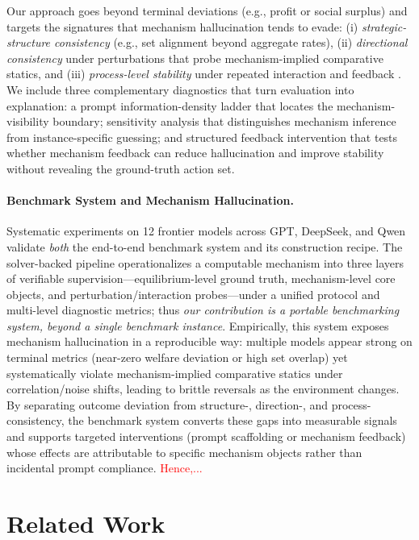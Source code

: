 \documentclass[sigconf,anonymous,review]{acmart}
\theoremstyle{definition}
\begin{document}
Our approach goes beyond terminal deviations (e.g., profit or social surplus) and targets the signatures that mechanism hallucination tends to evade: (i) \emph{strategic-structure consistency} (e.g., set alignment beyond aggregate rates), (ii) \emph{directional consistency} under perturbations that probe mechanism-implied comparative statics, and (iii) \emph{process-level stability} under repeated interaction and feedback \citep{akata2025repeatedgames}. We include three complementary diagnostics that turn evaluation into explanation: a prompt information-density ladder that locates the mechanism-visibility boundary; sensitivity analysis that distinguishes mechanism inference from instance-specific guessing; and structured feedback intervention that tests whether mechanism feedback can reduce hallucination and improve stability without revealing the ground-truth action set.

\paragraph{Benchmark System and Mechanism Hallucination.}
Systematic experiments on 12 frontier models across GPT, DeepSeek, and Qwen validate \emph{both} the end-to-end benchmark system and its construction recipe. The solver-backed pipeline operationalizes a computable mechanism into three layers of verifiable supervision—equilibrium-level ground truth, mechanism-level core objects, and perturbation/interaction probes—under a unified protocol and multi-level diagnostic metrics; thus \emph{our contribution is a portable benchmarking system, beyond a single benchmark instance}. Empirically, this system exposes mechanism hallucination in a reproducible way: multiple models appear strong on terminal metrics (near-zero welfare deviation or high set overlap) yet systematically violate mechanism-implied comparative statics under correlation/noise shifts, leading to brittle reversals as the environment changes. By separating outcome deviation from structure-, direction-, and process-consistency, the benchmark system converts these gaps into measurable signals and supports targeted interventions (prompt scaffolding or mechanism feedback) whose effects are attributable to specific mechanism objects rather than incidental prompt compliance. \textcolor{red}{Hence,...}

\section{Related Work}
\label{sec:related_work}
\end{document}
